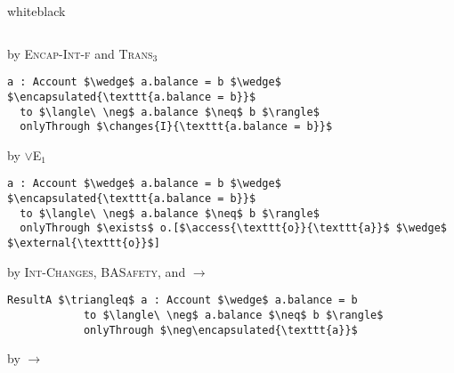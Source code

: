 \documentclass[acmsmall,review,anonymous]{acmart}\settopmatter{printfolios=true,printccs=false,printacmref=false}
\begin{document}
\begin{minipage}{\linewidth}
\begin{proofBox}{white}{black}
\begin{minipage}{0.75\textwidth}
\begin{lstlisting}[language = Chainmail, mathescape=true]
\end{lstlisting}
\end{minipage}
\begin{minipage}{0.24\textwidth}
\scriptsize
\hfill by \textsc{Encap-Int-f} and \textsc{Trans}$_3$
\end{minipage}
\begin{minipage}{0.75\textwidth}
\scriptsize
\begin{lstlisting}[language = Chainmail, mathescape=true]
a : Account $\wedge$ a.balance = b $\wedge$ $\encapsulated{\texttt{a.balance = b}}$ 
  to $\langle\ \neg$ a.balance $\neq$ b $\rangle$ 
  onlyThrough $\changes{I}{\texttt{a.balance = b}}$
\end{lstlisting}
\end{minipage}
\begin{minipage}{0.24\textwidth}
\scriptsize
\hfill by $\vee$\textsc{E}$_1$
\end{minipage}
\begin{minipage}{0.75\textwidth}
\begin{lstlisting}[language = Chainmail, mathescape=true]
a : Account $\wedge$ a.balance = b $\wedge$ $\encapsulated{\texttt{a.balance = b}}$ 
  to $\langle\ \neg$ a.balance $\neq$ b $\rangle$ 
  onlyThrough $\exists$ o.[$\access{\texttt{o}}{\texttt{a}}$ $\wedge$ $\external{\texttt{o}}$]
\end{lstlisting}
\end{minipage}
\begin{minipage}{0.24\textwidth}
\scriptsize
\hfill by \textsc{Int-Changes}, \textsc{BASafety}, and $\longrightarrow$
\end{minipage}
\begin{minipage}{0.75\textwidth}
\begin{lstlisting}[language = Chainmail, mathescape=true, frame = none]
ResultA $\triangleq$ a : Account $\wedge$ a.balance = b  
            to $\langle\ \neg$ a.balance $\neq$ b $\rangle$ 
            onlyThrough $\neg\encapsulated{\texttt{a}}$
\end{lstlisting}
\end{minipage}
\begin{minipage}{0.24\textwidth}
\scriptsize
\hfill by $\longrightarrow$
\end{minipage}
\end{proofBox}


\end{minipage}
\end{document}

